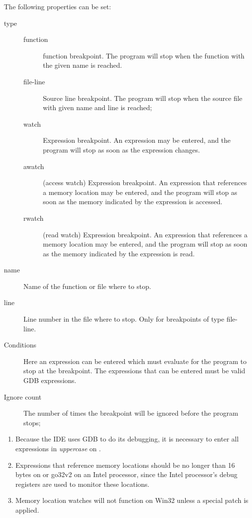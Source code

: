 The following properties can be set:
\begin{description}
\item[type]
\begin{description}
\item[function] function breakpoint. The program will stop when the function
with the given name is reached.
\item[file-line] Source line breakpoint. The program will stop when the
source file with given name and line is reached;
\item[watch] Expression breakpoint. An expression may be entered, and the
program will stop as soon as the expression changes.
\item[awatch] (access watch) Expression breakpoint. An expression that references a 
memory location may be entered, and the program will stop as soon as 
the memory indicated by the expression is accessed.
\item[rwatch] (read watch) Expression breakpoint. An expression that references a
memory location may be entered, and the program will stop as soon as 
the memory indicated by the expression is read.
\end{description}
\item[name] Name of the function or file where to stop.
\item[line] Line number in the file where to stop. Only for breakpoints of
type file-line.
\item[Conditions] Here an expression can be entered which must evaluate 
 for the program to stop at the breakpoint. The expressions that
can be entered must be valid GDB expressions.
\item[Ignore count] The number of times the breakpoint will be ignored
before the program stops; 
\end{description}
\begin{remark}
\begin{enumerate}
\item Because the IDE uses GDB to do its debugging, it is necessary to enter all
expressions in {\em uppercase} on \freebsd. 
\item Expressions that reference memory locations should be no longer than 16 
bytes on \linux or go32v2 on an Intel processor, since the Intel processor's 
debug registers are used to monitor these locations.
\item Memory location watches will not function on Win32 unless a special 
patch is applied. 
\end{enumerate}
\end{remark}

